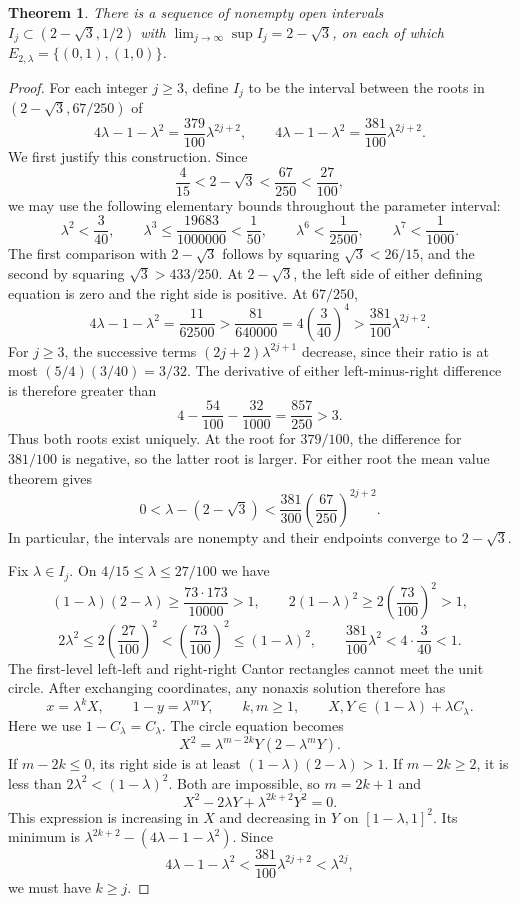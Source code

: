 \documentclass[11pt,a4paper]{amsart}
\numberwithin{equation}{section}
\newtheorem{theorem}{Theorem}[section]
\theoremstyle{definition}
\begin{document}
\begin{theorem}\label{thm:circle-zero-intervals}
There is a sequence of nonempty open intervals
\(I_j\subset(2-\sqrt3,1/2)\) with
\(\lim_{j\to\infty}\sup I_j=2-\sqrt3\), on each of which
\(E_{2,\lambda}=\{(0,1),(1,0)\}\).
\end{theorem}
\begin{proof}
For each integer \(j\ge3\), define \(I_j\) to be the interval between
the roots in \((2-\sqrt3,67/250)\) of
\[
4\lambda-1-\lambda^2=\frac{379}{100}\lambda^{2j+2},
\qquad
4\lambda-1-\lambda^2=\frac{381}{100}\lambda^{2j+2}.
\]
We first justify this construction. Since
\[
\frac4{15}<2-\sqrt3<\frac{67}{250}<\frac{27}{100},
\]
we may use the following elementary bounds throughout the parameter
interval:
\[
\lambda^2<\frac3{40},\qquad
\lambda^3\le\frac{19683}{1000000}<\frac1{50},\qquad
\lambda^6<\frac1{2500},\qquad
\lambda^7<\frac1{1000}.
\]
The first comparison with \(2-\sqrt3\) follows by squaring
\(\sqrt3<26/15\), and the second by squaring \(\sqrt3>433/250\).
At \(2-\sqrt3\), the left side of either defining equation is zero
and the right side is positive. At \(67/250\),
\[
4\lambda-1-\lambda^2=\frac{11}{62500}
>\frac{81}{640000}
=4\left(\frac3{40}\right)^4
>\frac{381}{100}\lambda^{2j+2}.
\]
For \(j\ge3\), the successive terms
\((2j+2)\lambda^{2j+1}\) decrease, since their ratio is at most
\((5/4)(3/40)=3/32\). The derivative of either left-minus-right
difference is therefore greater than
\[
4-\frac{54}{100}-\frac{32}{1000}
=\frac{857}{250}>3.
\]
Thus both roots exist uniquely. At the root for \(379/100\), the
difference for \(381/100\) is negative, so the latter root is larger.
For either root the mean value theorem gives
\[
0<\lambda-(2-\sqrt3)
<\frac{381}{300}\left(\frac{67}{250}\right)^{2j+2}.
\]
In particular, the intervals are nonempty and their endpoints
converge to \(2-\sqrt3\).

Fix \(\lambda\in I_j\). On \(4/15\le\lambda\le27/100\) we have
\[
(1-\lambda)(2-\lambda)
\ge\frac{73\cdot173}{10000}>1,\qquad
2(1-\lambda)^2\ge2\left(\frac{73}{100}\right)^2>1,
\]
\[
2\lambda^2\le2\left(\frac{27}{100}\right)^2
<\left(\frac{73}{100}\right)^2\le(1-\lambda)^2,\qquad
\frac{381}{100}\lambda^2<4\cdot\frac3{40}<1.
\]
The first-level left-left and right-right Cantor rectangles cannot
meet the unit circle. After exchanging coordinates, any nonaxis
solution therefore has
\[
x=\lambda^kX,\qquad 1-y=\lambda^mY,\qquad
k,m\ge1,\qquad X,Y\in(1-\lambda)+\lambda C_\lambda .
\]
Here we use \(1-C_\lambda=C_\lambda\). The circle equation becomes
\[
X^2=\lambda^{m-2k}Y(2-\lambda^mY).
\]
If \(m-2k\le0\), its right side is at least
\((1-\lambda)(2-\lambda)>1\). If \(m-2k\ge2\), it is less than
\(2\lambda^2<(1-\lambda)^2\). Both are impossible, so \(m=2k+1\) and
\[
X^2-2\lambda Y+\lambda^{2k+2}Y^2=0.
\]
This expression is increasing in \(X\) and decreasing in \(Y\) on
\([1-\lambda,1]^2\). Its minimum is
\(\lambda^{2k+2}-(4\lambda-1-\lambda^2)\). Since
\[
4\lambda-1-\lambda^2
<\frac{381}{100}\lambda^{2j+2}<\lambda^{2j},
\]
we must have \(k\ge j\).


\end{proof}
\end{document}
